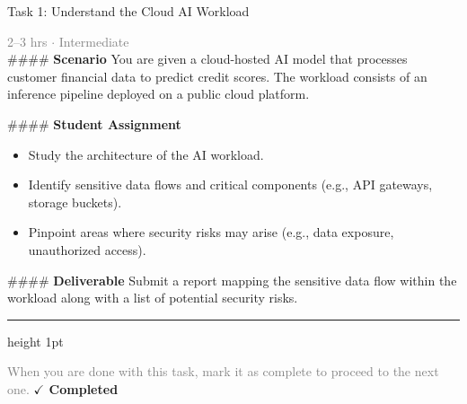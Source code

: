 \documentclass[10pt,a4paper]{article}
\begin{document}
\begin{taskbox}{Task 1: Understand the Cloud AI Workload}

    {\small \textcolor{gray}{2--3 hrs $\cdot$ Intermediate}}\\[12pt]

    \#\#\#\# \textbf{Scenario}
You are given a cloud-hosted AI model that processes customer financial data to predict credit scores. The workload consists of an inference pipeline deployed on a public cloud platform.

\#\#\#\# \textbf{Student Assignment}
\begin{itemize}
    \item Study the architecture of the AI workload.
    \item Identify sensitive data flows and critical components (e.g., API gateways, storage buckets).
    \item Pinpoint areas where security risks may arise (e.g., data exposure, unauthorized access).
\end{itemize}

\#\#\#\# \textbf{Deliverable}
Submit a report mapping the sensitive data flow within the workload along with a list of potential security risks.\par

    \vspace{16pt}

    \textcolor{cardBorder}{\hrule height 1pt}\vspace{8pt}

    \small \textcolor{gray}{When you are done with this task, mark it as complete to proceed to the next one.} \hfill \textbf{\textcolor{brandDark}{$\checkmark$ Completed}}

\end{taskbox}
\end{document}
